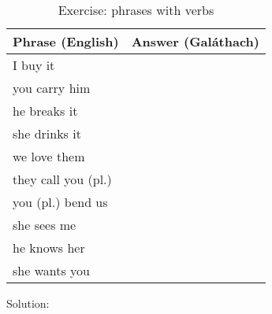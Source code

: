 \begin{table}[H]
\centering
\begin{tabular}{|l|M{10.0cm}|}
  \toprule
  \textbf{Phrase (English)} & \textbf{Answer (Gal\'{a}thach)}\\
  \toprule
  I buy it & \\
  \midrule
  you carry him & \\
  \midrule
  he breaks it & \\
  \midrule
  she drinks it & \\
  \midrule
  we love them & \\
  \midrule
  they call you (pl.) & \\
  \midrule
  you (pl.) bend us & \\
  \midrule
  she sees me & \\
  \midrule
  he knows her & \\
  \midrule
  she wants you & \\
  \bottomrule
\end{tabular}
\label{exercise_phrases_with_verbs}
\caption{Exercise: phrases with verbs}
\end{table}

\newpage
Solution:
\begin{table}[H]
\centering
{}
\label{solution_phrases_with_verbs}
\caption{Solution: phrases with verbs}
\end{table}
\newpage


